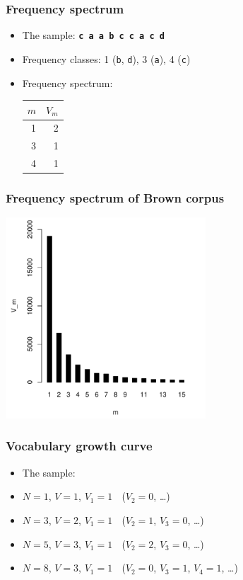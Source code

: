 \documentclass[handout,notes=show,t]{beamer} %
\begin{document}
\begin{frame}
\frametitle{Frequency spectrum}

  \begin{itemize}
  \item The sample:  \texttt{\textbf{c a a b c c a c d}}
  \item Frequency classes: 1 (\texttt{b}, \texttt{d}), 3 (\texttt{a}), 4 (\texttt{c})
  \item Frequency spectrum:
    \begin{center}
      \begin{tabular}{r|r}
        $m$ & $V_m$\\
        \hline
        1 & 2\\
        3 & 1\\
        4 & 1
      \end{tabular}
    \end{center}
  \end{itemize}
\end{frame}

\begin{frame}
  \frametitle{Frequency spectrum of Brown corpus}
   
  \ungap
  \begin{center}
    \includegraphics[height=7.5cm]{img/brown-spc}
  \end{center}
\end{frame}

\begin{frame}
 \frametitle{Vocabulary growth curve}

  \begin{itemize}
  \item<1-> The sample: \texttt{   }
  \item<2-> $N = 1$, $V = 1$, $V_1 = 1$ $\;$ ($V_2 = 0$, \ldots)
  \item<3-> $N = 3$, $V = 2$, $V_1 = 1$ $\;$ ($V_2 = 1$, $V_3 = 0$, \ldots)
  \item<4-> $N = 5$, $V = 3$, $V_1 = 1$ $\;$ ($V_2 = 2$, $V_3 = 0$, \ldots)
  \item<5-> $N = 8$, $V = 3$, $V_1 = 1$ $\;$ ($V_2 = 0$, $V_3 = 1$, $V_4 = 1$, \ldots)
  \end{itemize}
\end{frame}
\end{document}
